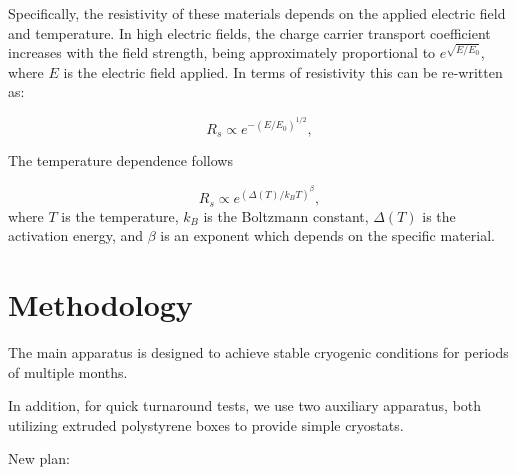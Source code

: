\documentclass[a4paper,12pt]{article}
\begin{document}
Specifically, the resistivity of these materials depends on the applied electric field and temperature.  
In high electric fields, the charge carrier transport coefficient increases with the field strength, being approximately proportional to $e^{\sqrt{E/E_0}}$, where $E$ is the electric field applied. 
In terms of resistivity this can be re-written as:

\begin{equation}
\label{eq:efield}
{R_s} \propto e^{- (E / E_0)^{1/2}},
\end{equation}

The temperature dependence follows

\begin{equation}
\label{eq:Tdep}
R_s \propto  e^{( \Delta(T) / k_B T)^{\beta}},
\end{equation}
where $T$ is the temperature, $k_B$ is the Boltzmann constant, $\Delta(T)$ is the activation energy, and $\beta$ is an exponent which depends on the specific material.



\section{Methodology}
\label{sec:expsetup}

The main apparatus is designed to achieve stable cryogenic conditions for periods of multiple months. 

In addition, for quick turnaround tests, we use two auxiliary apparatus, both utilizing extruded polystyrene boxes to provide simple cryostats. 


New plan:
\end{document}
